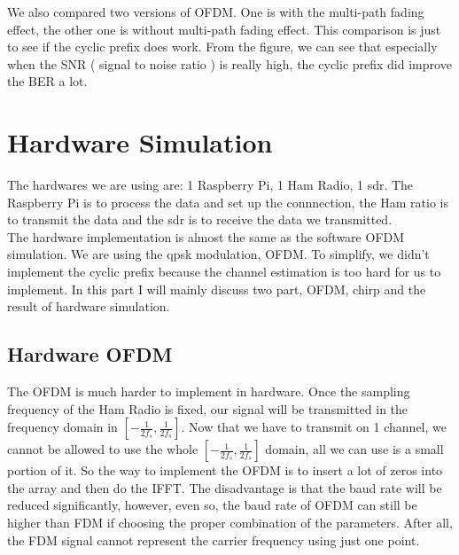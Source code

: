 \documentclass[twocolumn,conference]{IEEEtran}
\begin{document}
We also compared two versions of OFDM. One is with the multi-path fading effect, the other one is without multi-path fading effect. This comparison is just to see if the cyclic prefix does work. From the figure, we can see that especially when the SNR ( signal to noise ratio ) is really high, the cyclic prefix did improve the BER a lot.


\section{Hardware Simulation}
The hardwares we are using are: 1 Raspberry Pi, 1 Ham Radio, 1 sdr. The Raspberry Pi is to process the data and set up the connnection, the Ham ratio is to transmit the data and the sdr is to receive the data we transmitted.\\
The hardware implementation is almost the same as the software OFDM simulation. We are using the qpsk modulation, OFDM. To simplify, we didn't implement the cyclic prefix because the channel estimation is too hard for us to implement. In this part I will mainly discuss two part, OFDM, chirp and the result of hardware simulation.
\subsection{Hardware OFDM}
The OFDM is much harder to implement in hardware. Once the sampling frequency of the Ham Radio is fixed, our signal will be transmitted in the frequency domain in $[-\frac{1}{2 f_s},\frac{1}{2 f_s}]$. Now that we have to transmit on 1 channel, we cannot be allowed to use the whole $[-\frac{1}{2 f_s},\frac{1}{2 f_s}]$ domain, all we can use is a small portion of it. So the way to implement the OFDM is to insert a lot of zeros into the array and then do the IFFT. The disadvantage is that the baud rate will be reduced significantly, however, even so, the baud rate of OFDM can still be higher than FDM if choosing the proper combination of the parameters. After all, the FDM signal cannot represent the carrier frequency using just one point.
\end{document}
